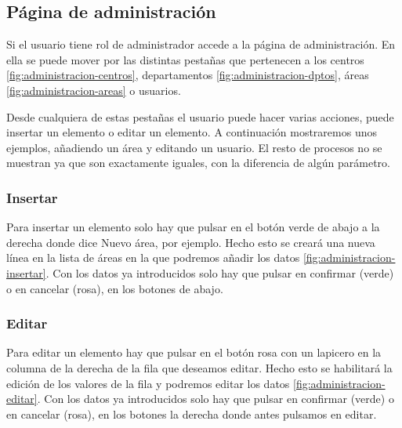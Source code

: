 
\subsection{Página de administración}

Si el usuario tiene rol de administrador accede a la página de administración. En ella se puede mover por las distintas pestañas que pertenecen a los centros \ref{fig:administracion-centros}, departamentos \ref{fig:administracion-dptos}, áreas \ref{fig:administracion-areas} o usuarios.


Desde cualquiera de estas pestañas el usuario puede hacer varias acciones, puede insertar un elemento o editar un elemento. A continuación mostraremos unos ejemplos, añadiendo un área y editando un usuario. El resto de procesos no se muestran ya que son exactamente iguales, con la diferencia de algún parámetro.

\subsubsection{Insertar}

Para insertar un elemento solo hay que pulsar en el botón verde de abajo a la derecha donde dice Nuevo área, por ejemplo. Hecho esto se creará una nueva línea en la lista de áreas en la que podremos añadir los datos \ref{fig:administracion-insertar}. Con los datos ya introducidos solo hay que pulsar en confirmar (verde) o en cancelar (rosa), en los botones de abajo.


\subsubsection{Editar}

Para editar un elemento hay que pulsar en el botón rosa con un lapicero en la columna de la derecha de la fila que deseamos editar. Hecho esto se habilitará la edición de los valores de la fila y podremos editar los datos \ref{fig:administracion-editar}. Con los datos ya introducidos solo hay que pulsar en confirmar (verde) o en cancelar (rosa), en los botones la derecha donde antes pulsamos en editar.

